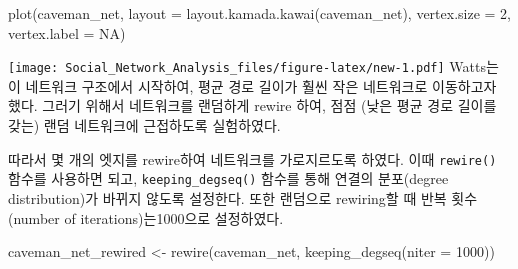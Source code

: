 \documentclass[
]{book}
\newenvironment{Shaded}{\begin{snugshade}}{\end{snugshade}}
\newcommand{\AttributeTok}[1]{\textcolor[rgb]{0.77,0.63,0.00}{#1}}
\newcommand{\CommentTok}[1]{\textcolor[rgb]{0.56,0.35,0.01}{\textit{#1}}}
\newcommand{\ConstantTok}[1]{\textcolor[rgb]{0.00,0.00,0.00}{#1}}
\newcommand{\DecValTok}[1]{\textcolor[rgb]{0.00,0.00,0.81}{#1}}
\newcommand{\FunctionTok}[1]{\textcolor[rgb]{0.00,0.00,0.00}{#1}}
\newcommand{\NormalTok}[1]{#1}
\newcommand{\OtherTok}[1]{\textcolor[rgb]{0.56,0.35,0.01}{#1}}
\newcommand{\SpecialCharTok}[1]{\textcolor[rgb]{0.00,0.00,0.00}{#1}}
\newcommand{\StringTok}[1]{\textcolor[rgb]{0.31,0.60,0.02}{#1}}
\begin{document}
\begin{Shaded}
\end{Shaded}

\begin{Shaded}
\begin{Highlighting}[]
\FunctionTok{plot}\NormalTok{(caveman\_net, }\AttributeTok{layout =} \FunctionTok{layout.kamada.kawai}\NormalTok{(caveman\_net), }\AttributeTok{vertex.size =} \DecValTok{2}\NormalTok{, }\AttributeTok{vertex.label =} \ConstantTok{NA}\NormalTok{)}
\end{Highlighting}
\end{Shaded}

\texttt{[image: Social\_Network\_Analysis\_files/figure-latex/new-1.pdf]}
Watts는 이 네트워크 구조에서 시작하여, 평균 경로 길이가 훨씬 작은 네트워크로 이동하고자 했다. 그러기 위해서 네트워크를 랜덤하게 rewire 하여, 점점 (낮은 평균 경로 길이를 갖는) 랜덤 네트워크에 근접하도록 실험하였다.

따라서 몇 개의 엣지를 rewire하여 네트워크를 가로지르도록 하였다. 이때 \texttt{rewire()} 함수를 사용하면 되고, \texttt{keeping\_degseq()} 함수를 통해 연결의 분포(degree distribution)가 바뀌지 않도록 설정한다. 또한 랜덤으로 rewiring할 때 반복 횟수(number of iterations)는1000으로 설정하였다.

\begin{Shaded}
\begin{Highlighting}[]
\NormalTok{caveman\_net\_rewired }\OtherTok{\textless{}{-}}  \FunctionTok{rewire}\NormalTok{(caveman\_net, }\FunctionTok{keeping\_degseq}\NormalTok{(}\AttributeTok{niter =} \DecValTok{1000}\NormalTok{))}
\end{Highlighting}
\end{Shaded}
\end{document}
